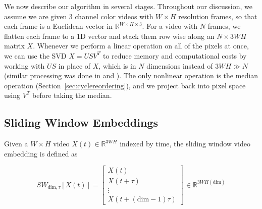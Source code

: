 \documentclass{article}
\begin{document}
We now describe our algorithm in several stages.  Throughout our discussion, we assume we are given 3 channel color videos with $W \times H$ resolution frames, so that each frame is a Euclidean vector in $\mathbb{R}^{W \times H \times 3}$.  For a video with $N$ frames, we flatten each frame to a 1D vector and stack them row wise along an $N \times 3WH$ matrix $X$.  Whenever we perform a linear operation on all of the pixels at once, we can use the SVD $X = USV^T$ to reduce memory and computational costs by working with $US$ in place of $X$, which is in $N$ dimensions instead of $3WH \gg N$ (similar processing was done in \cite{turk1991eigenfaces} and \cite{tralie2017quasi}).  The only nonlinear operation is the median operation (Section~\ref{sec:cyclereordering}), and we project back into pixel space using $V^T$ before taking the median.

\subsection{Sliding Window Embeddings}
\label{sec:slidingwindow}

Given a $W \times H$ video $X(t) \in \mathbb{R}^{3WH}$ indexed by time, the sliding window video embedding \cite{cao1998dynamics,traliehigh,tralie2017quasi} is defined as

\begin{equation}
SW_{\text{dim}, \tau}[X(t)] = \left[ \begin{array}{c} X(t) \\ X(t + \tau) \\ \vdots \\ X(t + (\text{dim}-1)\tau)  \end{array} \right] \in \mathbb{R}^{3WH(\text{dim})}
\end{equation}
\end{document}
